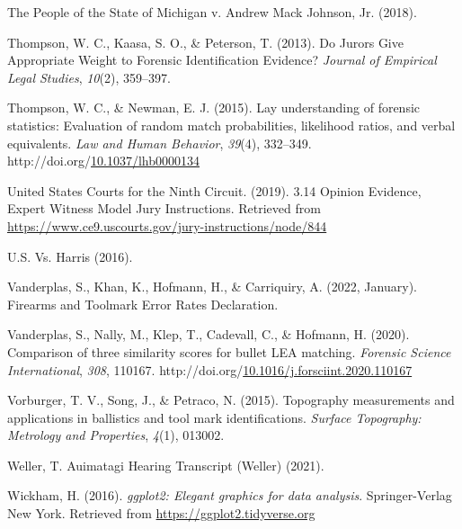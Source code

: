 \documentclass[print]{nuthesis}
\newlength{\cslhangindent}
\newenvironment{CSLReferences}[2]%
{\setlength{\parindent}{0pt}%
\everypar{\setlength{\hangindent}{\cslhangindent}}\ignorespaces}%
{\par}
\begin{document}
\begin{CSLReferences}{1}{0}
\leavevmode{}%
The {People} of the {State} of {Michigan} v. Andrew {Mack} {Johnson}, {Jr.} (2018).

\leavevmode{}%
Thompson, W. C., Kaasa, S. O., \& Peterson, T. (2013). Do {Jurors} {Give} {Appropriate} {Weight} to {Forensic} {Identification} {Evidence}? \emph{Journal of Empirical Legal Studies}, \emph{10}(2), 359--397.

\leavevmode{}%
Thompson, W. C., \& Newman, E. J. (2015). Lay understanding of forensic statistics: {Evaluation} of random match probabilities, likelihood ratios, and verbal equivalents. \emph{Law and Human Behavior}, \emph{39}(4), 332--349. http://doi.org/\href{https://doi.org/10.1037/lhb0000134}{10.1037/lhb0000134}

\leavevmode{}%
United States Courts for the Ninth Circuit. (2019). 3.14 {Opinion} {Evidence}, {Expert} {Witness} {\textbar} {Model} {Jury} {Instructions}. Retrieved from \url{https://www.ce9.uscourts.gov/jury-instructions/node/844}

\leavevmode{}%
{U.S.} Vs. {Harris} (2016).

\leavevmode{}%
Vanderplas, S., Khan, K., Hofmann, H., \& Carriquiry, A. (2022, January). Firearms and {Toolmark} {Error} {Rates} {Declaration}.

\leavevmode{}%
Vanderplas, S., Nally, M., Klep, T., Cadevall, C., \& Hofmann, H. (2020). Comparison of three similarity scores for bullet {LEA} matching. \emph{Forensic Science International}, \emph{308}, 110167. http://doi.org/\href{https://doi.org/10.1016/j.forsciint.2020.110167}{10.1016/j.forsciint.2020.110167}

\leavevmode{}%
Vorburger, T. V., Song, J., \& Petraco, N. (2015). Topography measurements and applications in ballistics and tool mark identifications. \emph{Surface Topography: Metrology and Properties}, \emph{4}(1), 013002.

\leavevmode{}%
Weller, T. {Auimatagi} {Hearing} {Transcript} ({Weller}) (2021).

\leavevmode{}%
Wickham, H. (2016). \emph{ggplot2: Elegant graphics for data analysis}. Springer-Verlag New York. Retrieved from \url{https://ggplot2.tidyverse.org}

\end{CSLReferences}
\end{document}
